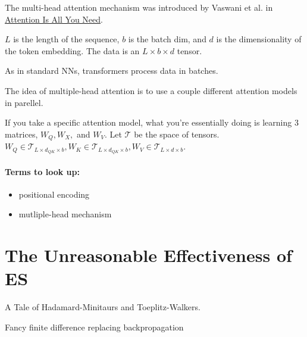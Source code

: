 The multi-head attention mechanism was introduced by Vaswani et al. in \href{https://paperswithcode.com/paper/attention-is-all-you-need}{Attention Is All You Need}.


$L$ is the length of the sequence, $b$ is the batch dim, and $d$ is the dimensionality of the token embedding. The data is an $L \times b\times d$ tensor. 

As in standard NNs, transformers process data in batches. 

The idea of multiple-head attention is to use a couple different attention models in parellel.  

If you take a specific attention model, what you're essentially doing is learning 3 matrices, $W_Q, W_X,$ and $W_V$. Let $\mathcal{T}$ be the space of tensors. $W_Q \in \mathcal{T}_{L\times d_{QK} \times b}, W_K \in \mathcal{T}_{L \times d_{QK} \times b }, W_V \in \mathcal{T}_{L \times d \times b }$.  


\subsubsection*{Terms to look up:}
\begin{itemize}
	\item positional encoding
	\item mutliple-head mechanism
\end{itemize}

\chapter{The Unreasonable Effectiveness of ES}

A Tale of Hadamard-Minitaurs and Toeplitz-Walkers.

Fancy finite difference replacing backpropagation

